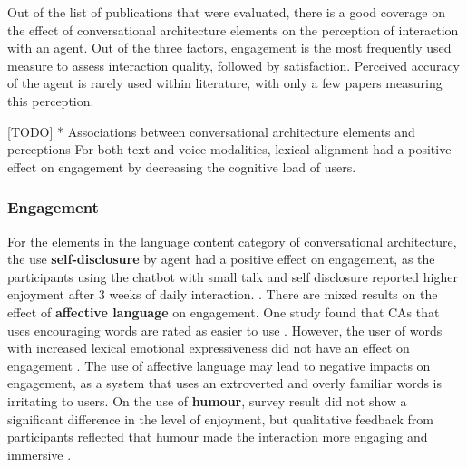 \documentclass[sigconf,screen,review, anonymous]{acmart}
\newcommand{\cmt}[1]{}%
\begin{document}
Out of the list of publications that were evaluated, there is a good coverage on the effect of conversational architecture elements on the perception of interaction with an agent. Out of the three factors, engagement is the most frequently used measure to assess interaction quality, followed by satisfaction. Perceived accuracy of the agent is rarely used within literature, with only a few papers measuring this perception. 

[TODO] * Associations between conversational architecture elements and perceptions
For both text and voice modalities, lexical alignment had a positive effect on engagement by decreasing the cognitive load of users. 

\subsubsection{Engagement}
For the elements in the language content category of conversational architecture, the use \textbf{self-disclosure} by agent had a positive effect on engagement, as the participants using the chatbot with small talk and self disclosure reported higher enjoyment after 3 weeks of daily interaction. \cite{lee2020hear}\cmt{[23]}. There are mixed results on the effect of \textbf{affective language} on engagement. One study found that CAs that uses encouraging words are rated as easier to use \cite{healey2013relating}\cmt{[39]}. However, the user of words with increased lexical emotional expressiveness did not have an effect on engagement \cite{zhu2022effects}\cmt{[26]}. The use of affective language may lead to negative impacts on engagement, as a system that uses an extroverted and overly familiar words is irritating to users. On the use of \textbf{humour}, survey result did not show a significant difference in the level of enjoyment, but qualitative feedback from participants reflected that humour made the interaction more engaging and immersive \cite{ceha2021can}\cmt{[57]}.


\end{document}
